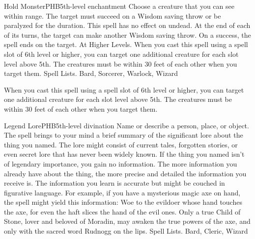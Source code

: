 \begin{spell}{Hold Monster}{PHB}{5th-level enchantment}
{
}
Choose a creature that you can see within range. The target must succeed on a Wisdom saving throw or be paralyzed for the duration. This spell has no effect on undead. At the end of each of its turns, the target can make another Wisdom saving throw. On a success, the spell ends on the target.
At Higher Levels. When you cast this spell using a spell slot of 6th level or higher, you can target one additional creature for each slot level above 5th. The creatures must be within 30 feet of each other when you target them.
Spell Lists. Bard, Sorcerer, Warlock, Wizard

 When you cast this spell using a spell slot of 6th level or higher, you can target one additional creature for each slot level above 5th. The creatures must be within 30 feet of each other when you target them.
\end{spell}

\begin{spell}{Legend Lore}{PHB}{5th-level divination}
{
}
Name or describe a person, place, or object. The spell brings to your mind a brief summary of the significant lore about the thing you named. The lore might consist of current tales, forgotten stories, or even secret lore that has never been widely known. If the thing you named isn’t of legendary importance, you gain no information. The more information you already have about the thing, the more precise and detailed the information you receive is.
The information you learn is accurate but might be couched in figurative language. For example, if you have a mysterious magic axe on hand, the spell might yield this information: Woe to the evildoer whose hand touches the axe, for even the haft slices the hand of the evil ones. Only a true Child of Stone, lover and beloved of Moradin, may awaken the true powers of the axe, and only with the sacred word Rudnogg on the lips.
Spell Lists. Bard, Cleric, Wizard
\end{spell}

